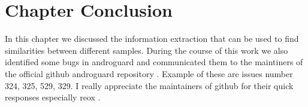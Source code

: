 \documentclass[../main.tex]{subfile}
\begin{document}
		
		\section{Chapter Conclusion} In this chapter we discussed the information extraction that can be used to find similarities between different samples. During the course of this work we also identified some bugs in androguard and communicated them to the maintiners of the official github androguard repository \cite{desnos2017androguard}. Example of these are issues number 324, 325, 529, 329. I really appreciate the maintainers of github for their quick responses especially reox \cite{reox}.
\end{document}
